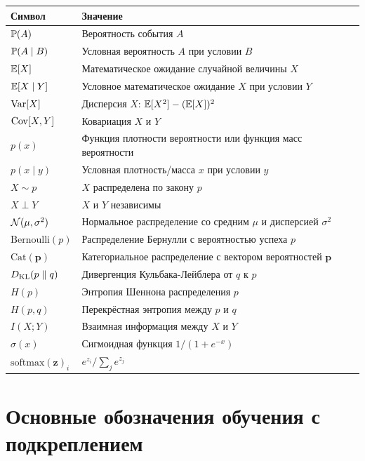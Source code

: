 \begin{center}
\begin{tabular}{@{}ll@{}}
\toprule
\textbf{Символ} & \textbf{Значение} \\
\midrule
$\mathbb{P}(A)$          & Вероятность события $A$ \\
$\mathbb{P}(A\mid B)$    & Условная вероятность $A$ при условии $B$ \\
$\operatorname{\mathbb{E}}[X]$             & Математическое ожидание случайной величины $X$ \\
$\operatorname{\mathbb{E}}[X \mid Y]$      & Условное математическое ожидание $X$ при условии $Y$ \\
$\operatorname{Var}[X]$           & Дисперсия $X$: $\operatorname{\mathbb{E}}[X^2]-(\operatorname{\mathbb{E}}[X])^2$ \\
$\operatorname{Cov}[X,Y]$         & Ковариация $X$ и $Y$ \\
$p(x)$              & Функция плотности вероятности или функция масс вероятности \\
$p(x \mid y)$       & Условная плотность/масса $x$ при условии $y$ \\
$X \sim p$          & $X$ распределена по закону $p$ \\
$X \perp Y$         & $X$ и $Y$ независимы \\
$\mathcal{N}(\mu,\sigma^2)$ & Нормальное распределение со средним $\mu$ и дисперсией $\sigma^2$ \\
$\mathrm{Bernoulli}(p)$ & Распределение Бернулли с вероятностью успеха $p$ \\
$\mathrm{Cat}(\mathbf{p})$ & Категориальное распределение с вектором вероятностей $\mathbf{p}$ \\
$D_{\mathrm{KL}}\!\left(p\;\|\;q\right)$         & Дивергенция Кульбака-Лейблера от $q$ к $p$ \\
$H(p)$              & Энтропия Шеннона распределения $p$ \\
$H(p,q)$            & Перекрёстная энтропия между $p$ и $q$ \\
$I(X;Y)$            & Взаимная информация между $X$ и $Y$ \\
$\sigma(x)$         & Сигмоидная функция $1/(1+e^{-x})$ \\
$\mathrm{softmax}(\mathbf{z})_i$ & $e^{z_i}/\sum_j e^{z_j}$ \\
\bottomrule
\end{tabular}
\end{center}

\newpage
\section*{Основные обозначения обучения с подкреплением}

